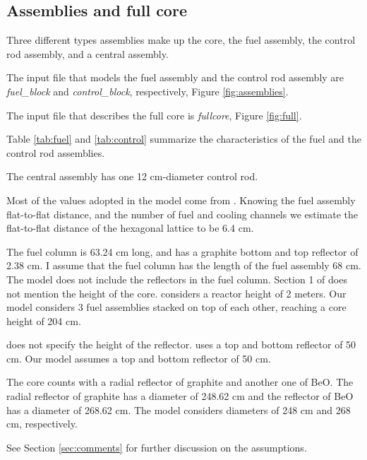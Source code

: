 \documentclass[11pt,letterpaper]{article}
\begin{document}
\subsection{Assemblies and full core}

Three different types assemblies make up the core, the fuel assembly, the control rod assembly, and a central assembly.

The input file that models the fuel assembly and the control rod assembly are \textit{fuel\_block} and \textit{control\_block}, respectively, Figure \ref{fig:assemblies}.

The input file that describes the full core is \textit{fullcore}, Figure \ref{fig:full}.

Table \ref{tab:fuel} and \ref{tab:control} summarize the characteristics of the fuel and the control rod assemblies.

The central assembly has one 12 cm-diameter control rod.

Most of the values adopted in the model come from \cite{hawari_development_2018}.
Knowing the fuel assembly flat-to-flat distance, and the number of fuel and cooling channels we estimate the flat-to-flat distance of the hexagonal lattice to be 6.4 cm.

The fuel column is 63.24 cm long, and has a graphite bottom and top reflector of 2.38 cm.
I assume that the fuel column has the length of the fuel assembly 68 cm.
The model does not include the reflectors in the fuel column.
Section 1 of \cite{hawari_development_2018} does not mention the height of the core. 
\cite{venneri_neutronic_2015} considers a reactor height of 2 meters.
Our model considers 3 fuel assemblies stacked on top of each other, reaching a core height of 204 cm.

\cite{hawari_development_2018} does not specify the height of the reflector.
\cite{venneri_neutronic_2015} uses a top and bottom reflector of 50 cm. 
Our model assumes a top and bottom reflector of 50 cm.

The core counts with a radial reflector of graphite and another one of BeO.
The radial reflector of graphite has a diameter of 248.62 cm and the reflector of BeO has a diameter of 268.62 cm\cite{hawari_development_2018}.
The model considers diameters of 248 cm and 268 cm, respectively.

See Section \ref{sec:comments} for further discussion on the assumptions.
\end{document}
